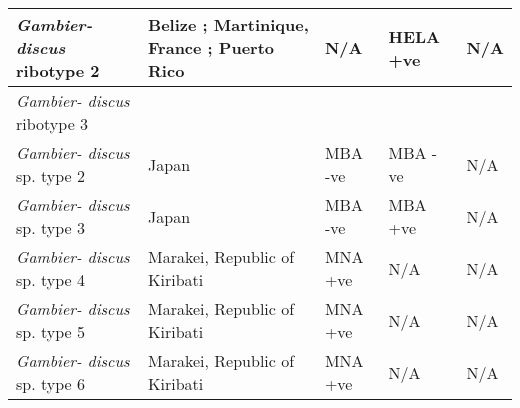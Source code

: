 \documentclass[12pt]{article}
\begin{document}
\begin{longtable}{ | p{2cm} | p{5.5cm} | p{2.3cm} | p{2.3cm} | p{2.3cm} | }
	\hline
	\emph{Gambier- discus} ribotype 2 & Belize \cite{litaker2010global}; Martinique, France \cite{litaker2010global}; Puerto Rico \cite{holland2013differences} & N/A & HELA +ve \cite{holland2013differences} & N/A\\
	\hline
	\emph{Gambier- discus} ribotype 3 & & & & \\ %
	\emph{Gambier- discus} sp. type 2 & Japan \cite{nishimura2013genetic} & MBA -ve \cite{nishimura2013genetic} & MBA -ve \cite{nishimura2013genetic} & N/A \\
	\hline
	\emph{Gambier- discus} sp. type 3 & Japan \cite{nishimura2013genetic} & MBA -ve \cite{nishimura2013genetic} & MBA +ve \cite{nishimura2013genetic} & N/A \\
	\hline
	\emph{Gambier- discus} sp. type 4 &  Marakei, Republic of Kiribati \cite{xu2014distribution}& MNA +ve \cite{xu2014distribution} & N/A & N/A \\
	\hline
	\emph{Gambier- discus} sp. type 5 & Marakei, Republic of Kiribati \cite{xu2014distribution}& MNA +ve \cite{xu2014distribution} & N/A & N/A \\
	\hline
	\emph{Gambier- discus} sp. type 6 & Marakei, Republic of Kiribati \cite{xu2014distribution}& MNA +ve \cite{xu2014distribution} & N/A & N/A \\
\hline
	\end{longtable}
	\FloatBarrier
\end{document}
